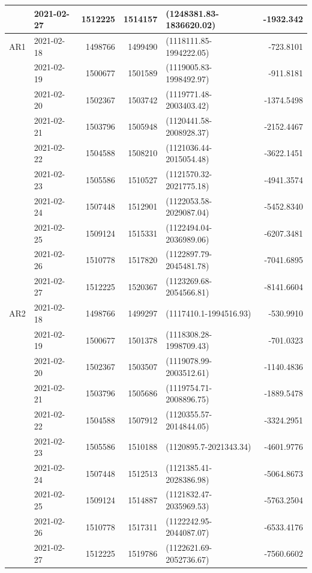 \documentclass[10pt,letterpaper]{article}
\begin{document}
\begin{table}[!h]
{\begin{tabular}[t]{l|l|r|r|l|r}
&2021-02-27 & 1512225 & 1514157 & (1248381.83-1836620.02) & -1932.342\\
\hline
AR1&2021-02-18 & 1498766 & 1499490 & (1118111.85-1994222.05) & -723.8101\\
&2021-02-19 & 1500677 & 1501589 & (1119005.83-1998492.97) & -911.8181\\
&2021-02-20 & 1502367 & 1503742 & (1119771.48-2003403.42) & -1374.5498\\
&2021-02-21 & 1503796 & 1505948 & (1120441.58-2008928.37) & -2152.4467\\
&2021-02-22 & 1504588 & 1508210 & (1121036.44-2015054.48) & -3622.1451\\
&2021-02-23 & 1505586 & 1510527 & (1121570.32-2021775.18) & -4941.3574\\
&2021-02-24 & 1507448 & 1512901 & (1122053.58-2029087.04) & -5452.8340\\
&2021-02-25 & 1509124 & 1515331 & (1122494.04-2036989.06) & -6207.3481\\
&2021-02-26 & 1510778 & 1517820 & (1122897.79-2045481.78) & -7041.6895\\
&2021-02-27 & 1512225 & 1520367 & (1123269.68-2054566.81) & -8141.6604\\
\hline
AR2&2021-02-18 & 1498766 & 1499297 & (1117410.1-1994516.93) & -530.9910\\
&2021-02-19 & 1500677 & 1501378 & (1118308.28-1998709.43) & -701.0323\\
&2021-02-20 & 1502367 & 1503507 & (1119078.99-2003512.61) & -1140.4836\\
&2021-02-21 & 1503796 & 1505686 & (1119754.71-2008896.75) & -1889.5478\\
&2021-02-22 & 1504588 & 1507912 & (1120355.57-2014844.05) & -3324.2951\\
&2021-02-23 & 1505586 & 1510188 & (1120895.7-2021343.34) & -4601.9776\\
&2021-02-24 & 1507448 & 1512513 & (1121385.41-2028386.98) & -5064.8673\\
&2021-02-25 & 1509124 & 1514887 & (1121832.47-2035969.53) & -5763.2504\\
&2021-02-26 & 1510778 & 1517311 & (1122242.95-2044087.07) & -6533.4176\\
&2021-02-27 & 1512225 & 1519786 & (1122621.69-2052736.67) & -7560.6602\\
\hline
\end{tabular}}
\end{table}
\end{document}
